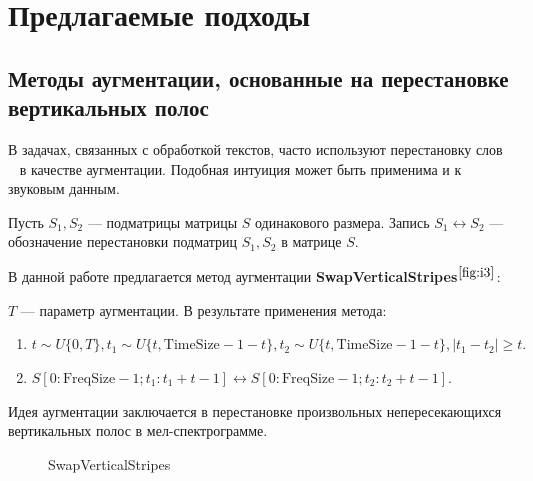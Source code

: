 \documentclass[12pt, fleqn]{article}
\begin{document}
\newpage

\section{Предлагаемые подходы}

\subsection{Методы аугментации, основанные на перестановке вертикальных полос}

В задачах, связанных с обработкой текстов, часто используют перестановку слов ~\cite{RandomSwap} в качестве аугментации. Подобная интуиция может быть применима и к звуковым данным. 

Пусть $S_1, S_2$ --- подматрицы матрицы $S$ одинакового размера. Запись \newline $S_1 \leftrightarrow S_2$ --- обозначение перестановки подматриц $S_1, S_2$ в матрице $S$.

В данной работе предлагается метод аугментации \textbf{SwapVerticalStripes}$^{\ref{fig:i3}}$:

$T$ --- параметр аугментации. В результате применения метода: 
\begin{enumerate}
    \item $t \sim U\{0, T\}, t_1 \sim U\{t, \text{TimeSize} - 1 - t\}, t_2 \sim U\{t, \text{TimeSize} - 1 - t\}, |t_1 - t_2| \geq t.$
    \item $S[0:\text{FreqSize} - 1; t_1: t_1 + t - 1] \leftrightarrow S[0:\text{FreqSize} - 1; t_2 : t_2 + t - 1]$.
\end{enumerate}

Идея аугментации заключается в перестановке произвольных непересекающихся вертикальных полос в мел-спектрограмме.

\begin{figure}[ht!]
	\caption{SwapVerticalStripes}
	\label{fig:i3}
\end{figure}
\end{document}
